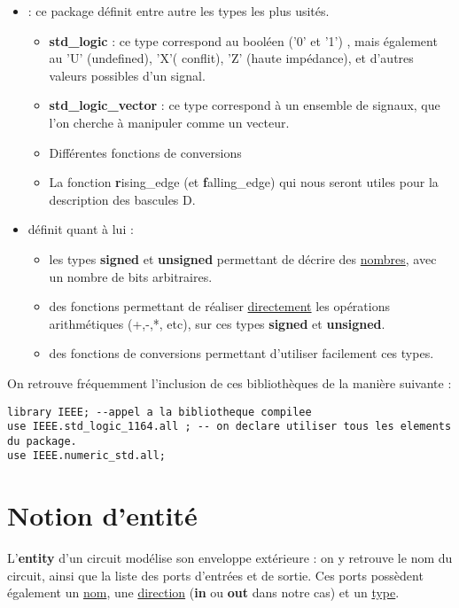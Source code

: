 \documentclass[a4paper,11pt]{article}
\begin{document}
\begin{itemize}

  \item {} : ce package définit entre autre les types les plus usités.
  \begin{itemize}
    \item \textbf{std\_logic} : ce type correspond au booléen ('0' et '1') , mais également au 'U' (undefined), 'X'( conflit), 'Z' (haute impédance), et d'autres valeurs possibles d'un signal.
    \item \textbf{std\_logic\_vector} : ce type correspond à un ensemble de signaux, que l'on cherche à manipuler comme un vecteur.
    \item Différentes fonctions de conversions
    \item La fonction {\textbf rising\_edge} (et {\textbf falling\_edge}) qui nous seront utiles pour la description des bascules D.
  \end{itemize}

  \item {} définit quant à lui :
  \begin{itemize}
    \item les types \textbf{signed} et \textbf{unsigned} permettant de décrire des \underline{nombres}, avec un nombre de bits arbitraires.
    \item des fonctions permettant de réaliser \underline{directement} les opérations arithmétiques (+,-,*, etc), sur ces types \textbf{signed} et \textbf{unsigned}.
    \item des fonctions de conversions permettant d'utiliser facilement ces types.
  \end{itemize}
\end{itemize}

On retrouve fréquemment l'inclusion de ces bibliothèques de la manière suivante :

\begin{lstlisting}
library IEEE; --appel a la bibliotheque compilee
use IEEE.std_logic_1164.all ; -- on declare utiliser tous les elements du package.
use IEEE.numeric_std.all;
\end{lstlisting}

\section{Notion d'entité}

L'\textbf{entity} d'un circuit modélise son enveloppe extérieure : on y retrouve le nom du circuit, ainsi que la liste des ports d'entrées et de sortie.
Ces ports possèdent également un \underline{nom}, une \underline{direction} (\textbf{in} ou \textbf{out} dans notre cas) et un \underline{type}.
\end{document}
